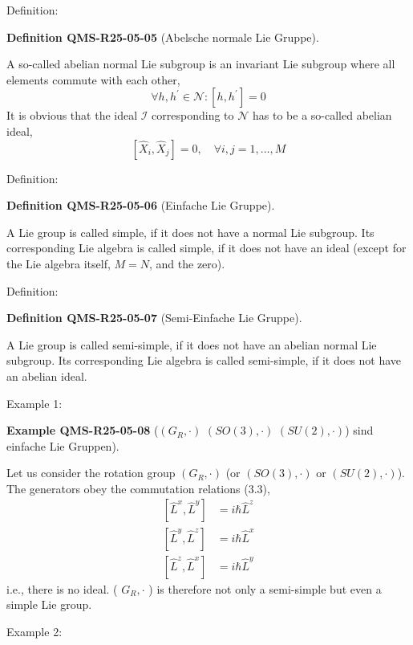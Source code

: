 \documentclass[10pt, letterpaper]{article}
\newcommand{\CustomHeading}[3]{%
  \par\medskip\noindent%
  \textbf{#1 #2} \textnormal{(#3)}.\enskip%
}
\newenvironment{DEF}[2]{\begin{unitbox}\CustomHeading{Definition}{#1}{#2}}{\end{unitbox}}
\newenvironment{EXA}[2]{\begin{unitbox}\CustomHeading{Example}{#1}{#2}}{\end{unitbox}}
\begin{document}
Definition: 

\begin{DEF}{QMS-R25-05-05}{Abelsche normale Lie Gruppe}
A so-called abelian normal Lie subgroup is an invariant Lie subgroup where all elements commute with each other,
$$
\forall h, h^{\prime} \in \mathcal{N}:\left[h, h^{\prime}\right]=0
$$
It is obvious that the ideal $\mathcal{I}$ corresponding to $\mathcal{N}$ has to be a so-called abelian ideal,
$$
\left[\hat{X}_{i}, \hat{X}_{j}\right]=0, \quad \forall i, j=1, \ldots, M
$$
\end{DEF}


Definition: 

\begin{DEF}{QMS-R25-05-06}{Einfache Lie Gruppe}
A Lie group is called simple, if it does not have a normal Lie subgroup. Its corresponding Lie algebra is called simple, if it does not have an ideal (except for the Lie algebra itself, $M=N$, and the zero).
\end{DEF}


Definition: 

\begin{DEF}{QMS-R25-05-07}{Semi-Einfache Lie Gruppe}
A Lie group is called semi-simple, if it does not have an abelian normal Lie subgroup. Its corresponding Lie algebra is called semi-simple, if it does not have an abelian ideal.
\end{DEF}



Example 1: 


\begin{EXA}{QMS-R25-05-08}{$\left(G_{R}, \cdot\right)$ $(S O(3), \cdot)$ $(S U(2), \cdot)$) sind einfache Lie Gruppen}
Let us consider the rotation group $\left(G_{R}, \cdot\right)$ (or $(S O(3), \cdot)$ or $(S U(2), \cdot)$). The generators obey the commutation relations (3.3),
$$
\begin{aligned}
{\left[\hat{L}^{x}, \hat{L}^{y}\right] } & =i \hbar \hat{L}^{z} \\
{\left[\hat{L}^{y}, \hat{L}^{z}\right] } & =i \hbar \hat{L}^{x} \\
{\left[\hat{L}^{z}, \hat{L}^{x}\right] } & =i \hbar \hat{L}^{y}
\end{aligned}
$$
i.e., there is no ideal. ( $G_{R}, \cdot$ ) is therefore not only a semi-simple but even a simple Lie group.
\end{EXA}



Example 2: 
\end{document}
